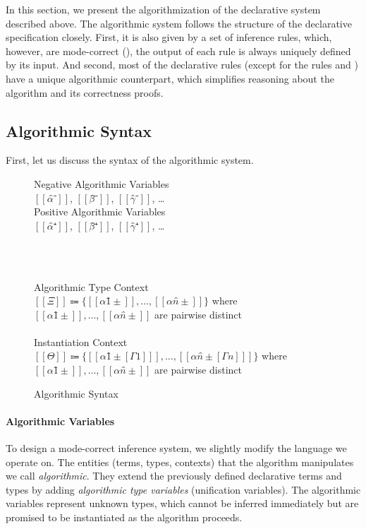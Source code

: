 \label{sec:algorithm}

In this section, we present the algorithmization of the declarative system described above.
The algorithmic system follows the structure of the declarative specification closely.
First, it is also given by a set of inference rules, which, however,
are mode-correct (\cite{dunfield2020:bidirectional}), \ie
the output of each rule is always uniquely defined by its input.
And second, most of the declarative rules 
(except for the rules  and )
have a unique algorithmic counterpart, 
which simplifies reasoning about the algorithm and its correctness proofs.


\subsection{Algorithmic Syntax}
\label{sec:algo-syntax}

First, let us discuss the syntax of the algorithmic system. 

\begin{figure}
  \begin{multicols}{2}
      Negative Algorithmic Variables\\
      $[[α̂⁻]]$, $[[β̂⁻]]$, $[[γ̂⁻]]$, \dots\\
      \columnbreak
      Positive Algorithmic Variables\\
      $[[α̂⁺]]$, $[[β̂⁺]]$, $[[γ̂⁺]]$, \dots\\
  \end{multicols}
  \hfill\\
  \begin{multicols}{2}
      \ottuNShort
      \columnbreak
      \ottuPShort
  \end{multicols}
  \hfill\\
  Algorithmic Type Context\\
   $[[Ξ]] \Coloneqq \{[[α1̂±]], \dots, [[αn̂±]]\}$ where $[[α1̂±]], \dots, [[αn̂±]]$ are pairwise distinct \\
  \hfill\\
  Instantiation Context\\
   $[[Θ]] \Coloneqq \{[[ α1̂±[Γ1] ]], \dots, [[ αn̂±[Γn] ]]\}$ where $[[α1̂±]], \dots, [[αn̂±]]$ are pairwise distinct \\
  \caption{Algorithmic Syntax}
  \label{fig:algo-syntax}
\end{figure}

\paragraph*{Algorithmic Variables}
To design a mode-correct inference system, we slightly modify the language we operate on.
The entities (terms, types, contexts) that the algorithm manipulates we call \emph{algorithmic}. 
They extend the previously defined declarative terms and types by adding 
\emph{algorithmic type variables} (\aka unification variables). 
The algorithmic variables represent unknown types, 
which cannot be inferred immediately but are promised to be instantiated
as the algorithm proceeds.

